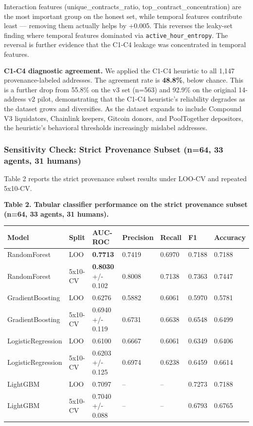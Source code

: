 \documentclass[sigconf,nonacm=false]{acmart}
\begin{document}
Interaction features (unique\_contracts\_ratio, top\_contract\_concentration) are the most important group on the honest set, while temporal features contribute least — removing them actually helps by +0.005. This reverses the leaky-set finding where temporal features dominated via \texttt{active\_hour\_entropy}. The reversal is further evidence that the C1-C4 leakage was concentrated in temporal features.

\textbf{C1-C4 diagnostic agreement.} We applied the C1-C4 heuristic to all 1,147 provenance-labeled addresses. The agreement rate is \textbf{48.8\%}, below chance. This is a further drop from 55.8\% on the v3 set (n=563) and 92.9\% on the original 14-address v2 pilot, demonstrating that the C1-C4 heuristic's reliability degrades as the dataset grows and diversifies. As the dataset expands to include Compound V3 liquidators, Chainlink keepers, Gitcoin donors, and PoolTogether depositors, the heuristic's behavioral thresholds increasingly mislabel addresses.

\subsubsection{Sensitivity Check: Strict Provenance Subset (n=64, 33 agents, 31 humans)}

Table 2 reports the strict provenance subset results under LOO-CV and repeated 5x10-CV.

\textbf{Table 2. Tabular classifier performance on the strict provenance subset (n=64, 33 agents, 31 humans).}

\begin{table}[h]
\centering
\small
\begin{tabular}{lllllll}
\toprule
Model & Split & AUC-ROC & Precision & Recall & F1 & Accuracy \\
\midrule
RandomForest & LOO & \textbf{0.7713} & 0.7419 & 0.6970 & 0.7188 & 0.7188 \\
RandomForest & 5x10-CV & \textbf{0.8030} +/- 0.102 & 0.8008 & 0.7138 & 0.7363 & 0.7447 \\
GradientBoosting & LOO & 0.6276 & 0.5882 & 0.6061 & 0.5970 & 0.5781 \\
GradientBoosting & 5x10-CV & 0.6940 +/- 0.119 & 0.6731 & 0.6638 & 0.6548 & 0.6499 \\
LogisticRegression & LOO & 0.6100 & 0.6667 & 0.6061 & 0.6349 & 0.6406 \\
LogisticRegression & 5x10-CV & 0.6203 +/- 0.125 & 0.6974 & 0.6238 & 0.6459 & 0.6614 \\
LightGBM & LOO & 0.7097 & -- & -- & 0.7273 & 0.7188 \\
LightGBM & 5x10-CV & 0.7040 +/- 0.088 & -- & -- & 0.6793 & 0.6765 \\
\bottomrule
\end{tabular}
\end{table}
\end{document}
